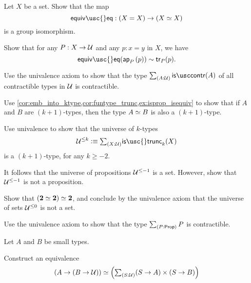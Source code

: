 \begin{exercises}
\item Let $X$ be a set. Show that the map
  \begin{equation*}
    \mathsf{equiv\usc{}eq} : (X=X)\to (\eqv{X}{X})
  \end{equation*}
  is a group isomorphism.
\item \label{ex:tr_ap} Show that for any $P:X\to \mathcal{U}$ and any $p:x=y$ in $X$, we have
\begin{equation*}
\mathsf{equiv\usc{}eq}(\ap{P}{p})\htpy \mathsf{tr}_P(p).
\end{equation*}
\item \label{ex:istrunc_UUtrunc}
\begin{subexenum}
\item Use the univalence axiom to show that the type $\sm{A:\UU}\iscontr(A)$ of all contractible types in $\mathcal{U}$ is contractible.
\item Use \cref{cor:emb_into_ktype,cor:funtype_trunc,ex:isprop_isequiv} to show that if $A$ and $B$ are $(k+1)$-types, then the type $\eqv{A}{B}$ is also a $(k+1)$-type.
\item Use univalence to show that the universe of $k$-types
\begin{equation*}
\UU^{\leq k}\defeq \sm{X:\UU}\mathsf{is\usc{}trunc}_k(X)
\end{equation*}
is a $(k+1)$-type, for any $k\geq -2$.
\item It follows that the universe of propositions $\mathcal{U}^{\leq-1}$ is a set. However, show that $\mathcal{U}^{\leq-1}$ is not a proposition.
\item Show that $\eqv{(\eqv{\bool}{\bool})}{\bool}$, and conclude by the univalence axiom that the universe of sets $\mathcal{U}^{\leq 0}$ is not a set. 
\end{subexenum}
\item Use the univalence axiom to show that the type $\sm{P:\prop}P$ is contractible.
\item Let $A$ and $B$ be small types. 
\begin{subexenum}
\item Construct an equivalence
\begin{equation*}
\eqv{(A\to (B\to\UU))}{\Big(\sm{S:\UU} (S\to A)\times (S\to B)\Big)}

\end{equation*}
\end{subexenum}
\end{exercises}
